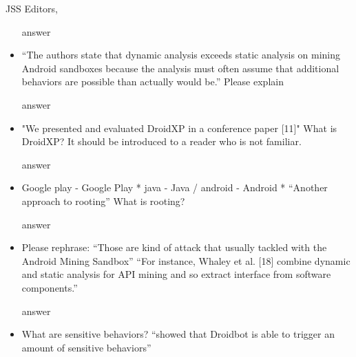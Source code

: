 \documentclass{letter}
\begin{document}
\begin{letter}{JSS Editors,}
\begin{itemize}
\vspace{0.2cm}

{\color{blue}{\bf Answer:} answer}

\vspace{0.2cm}

\item ``The authors state that dynamic analysis exceeds static analysis on mining Android sandboxes because the
analysis must often assume that additional behaviors are possible than actually would be.''
Please explain


\vspace{0.2cm}

{\color{blue}{\bf Answer:} answer}

\vspace{0.2cm}

\item "We presented and evaluated DroidXP in a conference paper [11]"
What is DroidXP? It should be introduced to a reader who is not familiar.


\vspace{0.2cm}

{\color{blue}{\bf Answer:} answer}

\vspace{0.2cm}

\item Google play - Google Play
* java - Java / android - Android
* ``Another approach to rooting''
What is rooting?


\vspace{0.2cm}

{\color{blue}{\bf Answer:} answer}

\vspace{0.2cm}

\item Please rephrase:
``Those are kind of attack that usually tackled with the Android Mining Sandbox''
``For instance, Whaley et al. [18] combine dynamic and static analysis for API mining and so extract interface from software components.''


\vspace{0.2cm}

{\color{blue}{\bf Answer:} answer}

\vspace{0.2cm}

\item What are sensitive behaviors? ``showed that Droidbot is able to trigger an amount of sensitive behaviors''


\vspace{0.2cm}


\end{itemize}
\end{letter}
\end{document}
